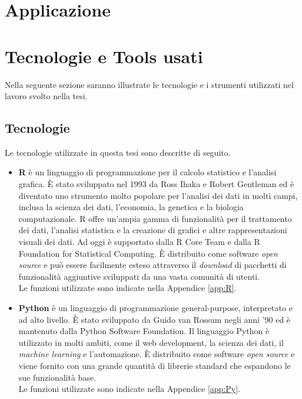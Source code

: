 \section{Applicazione}

\section{Tecnologie e Tools usati}
Nella seguente sezione saranno illustrate le tecnologie e i strumenti utilizzati nel lavoro svolto nella tesi. 
\subsection{Tecnologie}
Le tecnologie utilizzate in questa tesi sono descritte di seguito.
\begin{itemize}
	\item \textbf{R} \autocite{R-language} è un linguaggio di programmazione per il calcolo statistico e l'analisi grafica. È stato sviluppato nel 1993 da Ross Ihaka e Robert Gentleman ed è diventato uno strumento molto popolare per l'analisi dei dati in molti campi, inclusa la scienza dei dati, l'economia, la genetica e la biologia computazionale. R offre un'ampia gamma di funzionalità per il trattamento dei dati, l'analisi statistica e la creazione di grafici e altre rappresentazioni visuali dei dati. Ad oggi è supportato dalla R Core Team e dalla R Foundation for Statistical Computing. È distribuito come software \emph{open source} e può essere facilmente esteso attraverso il \emph{download} di pacchetti di funzionalità aggiuntive sviluppati da una vasta comunità di utenti.\\
	Le funzioni utilizzate sono indicate nella Appendice \ref{app:R}.
	\item \textbf{Python} \autocite{van2003introduction} è un linguaggio di programmazione general-purpose, interpretato e ad alto livello. È stato sviluppato da Guido van Rossum negli anni '90 ed è mantenuto dalla Python Software Foundation. Il linguaggio Python è utilizzato in molti ambiti, come il web development, la scienza dei dati, il\emph{ machine learning} e l'automazione. È distribuito come software \emph{open source} e viene fornito con una grande quantità di librerie standard che espandono le sue funzionalità base.\\
	Le funzioni utilizzate sono indicate nella Appendice \ref{app:Py}.
\end{itemize}


\begin{comment}
library(ggmosaic)
library(ggplot2)
library(gridExtra)
\end{comment}

